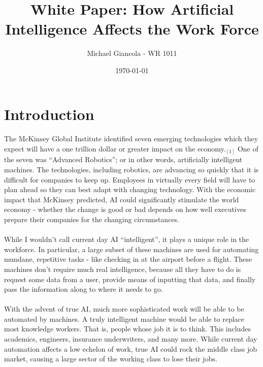 \documentclass{article}
\begin{document}
  \title{White Paper: How Artificial Intelligence Affects the Work Force}
  \author{Michael Giancola - WR 1011}
  \date{\today}
  \maketitle

  \cleardoublepage

  \section{Introduction}
    \paragraph{}
      The McKinsey Global Institute identified seven emerging technologies which
      they expect will have a one trillion dollar or greater impact on the economy.$_{[1]}$
      One of the seven was ``Advanced Robotics''; or in other words, artificially
      intelligent machines. The technologies, including robotics, are advancing
      so quickly that it is difficult for companies to keep up. Employees in virtually
      every field will have to plan ahead so they can best adapt with changing technology.
      With the economic impact that McKinsey predicted, AI could significantly
      stimulate the world economy - whether the change is good or bad depends
      on how well executives prepare their companies for the changing circumstances.

    \paragraph{}
      While I wouldn’t call current day AI ``intelligent'', it plays a unique
      role in the workforce. In particular, a large subset of these machines are used
      for automating mundane, repetitive tasks - like checking in at the airport
      before a flight. These machines don’t require much real intelligence,
      because all they have to do is request some data from a user, provide means
      of inputting that data, and finally pass the information along to where it
      needs to go.

    \paragraph{}
      With the advent of true AI, much more sophisticated work will be able to
      be automated by machines. A truly intelligent machine would be able to
      replace most knowledge workers. That is, people whose job it is to think.
      This includes academics, engineers, insurance underwriters, and many more.
      While current day automation affects a low echelon of work, true AI could
      rock the middle class job market, causing a large sector of the working
      class to lose their jobs.
\end{document}
